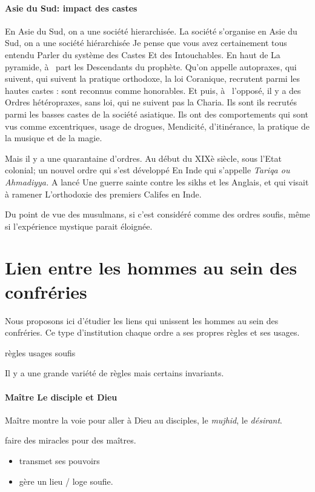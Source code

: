\paragraph{Asie du Sud: impact des castes}
En Asie du Sud, on a une société hierarchisée. 
La société s'organise 
 en Asie du Sud, on a une société hiérarchisée  Je pense que vous avez certainement tous entendu 
Parler du système des 
Castes 
Et des 
Intouchables. En haut de 
La pyramide, à  part les 
Descendants du prophète. 
Qu'on appelle autopraxes, 
 qui  suivent, qui  suivent la pratique orthodoxe, la loi 
Coranique, recrutent parmi les hautes castes :  sont reconnus comme honorables. 
Et puis, à  l'opposé, il y a des 
Ordres hétéropraxes, sans loi, qui  ne suivent pas la 
Charia. Ils sont ils recrutés parmi les basses castes 
de la société asiatique.  Ils ont des comportements qui  sont vus comme excentriques, 
usage de drogues, Mendicité, d'itinérance, la pratique 
de la musique 
et de la magie. 


Mais il y a une quarantaine 
d'ordres. Au début du XIXè siècle, sous l'Etat colonial;  un nouvel ordre 
qui  s'est développé 
En Inde qui  s'appelle \textit{Tariqa ou Ahmadiyya.  }
A lancé 
Une guerre sainte contre les sikhs et les 
Anglais, et qui  visait 
à  ramener 
L'orthodoxie des premiers 
Califes en Inde.  

Du point de vue des musulmans, si c'est considéré comme des ordres soufis, même si l'expérience mystique parait éloignée.

\section{Lien entre les hommes au sein des confréries}

Nous proposons ici d'étudier les
liens qui unissent les hommes au sein des confréries. 
Ce type d'institution 
 chaque ordre 
 a ses propres règles et ses 
usages.
\begin{Def}[Haddad]
     règles 
usages soufis
\end{Def}
Il y a une grande variété de règles mais certains invariants.

\paragraph{Maître 
Le disciple et Dieu }
Maître montre la voie pour aller à Dieu au disciples, le \textit{mujhid}, le \textit{désirant}. 


\begin{Def}[taramaq]
    faire des miracles pour des maîtres.
\end{Def}
\begin{itemize}
    \item transmet ses pouvoirs
    \item gère un lieu / loge soufie.
\end{itemize}


